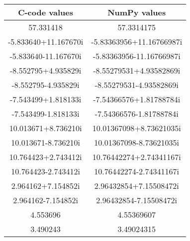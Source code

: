 \documentclass[a4paper, 14pt]{article}
\begin{document}
\begin{tabular}{|c|c|}
\hline
\textbf{C-code values} & \textbf{NumPy values} \\ \hline
57.331418 & 57.3314175 \\ 
-5.833640+11.167670i & -5.83363956+11.16766987i \\
-5.833640-11.167670i & -5.83363956-11.16766987i \\
-8.552795+4.935829i & -8.55279531+4.93582869i \\
-8.552795-4.935829i & -8.55279531-4.93582869i \\
-7.543499+1.818133i & -7.54366576+1.81788784i \\
-7.543499-1.818133i & -7.54366576-1.81788784i \\
10.013671+8.736210i & 10.01367098+8.73621035i \\
10.013671-8.736210i & 10.01367098-8.73621035i \\
10.764423+2.743412i & 10.76442274+2.74341167i \\
10.764423-2.743412i & 10.76442274-2.74341167i \\
2.964162+7.154852i & 2.96432854+7.15508472i \\
2.964162-7.154852i & 2.96432854-7.15508472i \\
4.553696 & 4.55369607 \\
3.490243 & 3.49024315 \\ \hline
\end{tabular}

\end{document}
